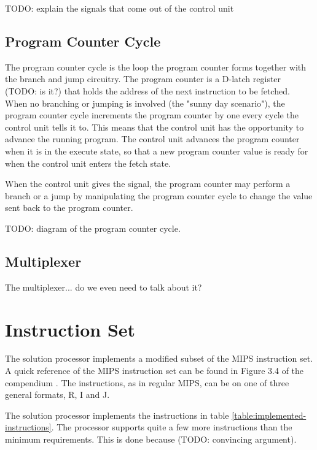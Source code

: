 TODO: explain the signals that come out of the control unit

\subsection{Program Counter Cycle}

The program counter cycle is the loop the program counter forms together with the branch and jump circuitry.
The program counter is a D-latch register (TODO: is it?) that holds the address of the next instruction to be fetched.
When no branching or jumping is involved (the "sunny day scenario"), the program counter cycle increments the program counter by one every cycle the control unit tells it to.
This means that the control unit has the opportunity to advance the running program.
The control unit advances the program counter when it is in the execute state, so that a new program counter value is ready for when the control unit enters the fetch state.

When the control unit gives the signal, the program counter may perform a branch or a jump by manipulating the program counter cycle to change the value sent back to the program counter.

TODO: diagram of the program counter cycle.

\subsection{Multiplexer}

The multiplexer... do we even need to talk about it?

\section{Instruction Set}

The solution processor implements a modified subset of the MIPS instruction set.
A quick reference of the MIPS instruction set can be found in Figure 3.4 of the compendium \cite{compendium}.
The instructions, as in regular MIPS, can be on one of three general formats, R, I and J.

The solution processor implements the instructions in table \ref{table:implemented-instructions}.
The processor supports quite a few more instructions than the minimum requirements.
This is done because (TODO: convincing argument).


